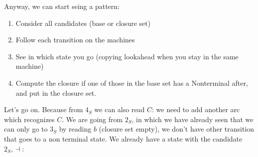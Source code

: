 			Anyway, we can start seing a pattern:
			\begin{enumerate}
				\item Consider all candidates (base or closure set)
				\item Follow each transition on the machines
				\item See in which state you go (copying lookahead when you stay in the same machine)
				\item Compute the closure if one of those in the base set has a Nonterminal after, and put in the closure set.
			\end{enumerate}
			Let's go on. Because from $4_S$ we can also read $C$: we need to add another arc which recognizes $C$. We are going from $2_S$, in which 
			we have already seen that we can only go to $3_S$ by reading $b$ (closure set empty), we don't have other transition that goes to a 
			non terminal state. We already have a state with the candidate $2_S,\dashv$:
